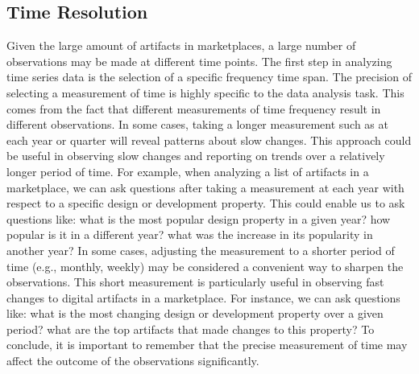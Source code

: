 \subsection{Time Resolution}
Given the large amount of artifacts in marketplaces, a large number of observations may be made at different time points.
The first step in analyzing time series data is the selection of a specific frequency time span.
The precision of selecting a measurement of time is highly specific to the data analysis task.
This comes from the fact that different measurements of time frequency result in different observations.
In some cases, taking a longer measurement such as at each year or quarter will reveal patterns about slow changes.
This approach could be useful in observing slow changes and reporting on trends over a relatively longer period of time.
For example, when analyzing a list of artifacts in a marketplace, we can ask questions after taking a measurement at each year with respect to a specific design or development property.
This could enable us to ask questions like: what is the most popular design property in a given year? how popular is it in a different year? what was the increase in its popularity in another year?
In some cases, adjusting the measurement to a shorter period of time (e.g., monthly, weekly) may be considered a convenient way to sharpen the observations.
This short measurement is particularly useful in observing fast changes to digital artifacts in a marketplace.
For instance, we can ask questions like: what is the most changing design or development property over a given period? what are the top artifacts that made changes to this property?
To conclude, it is important to remember that the precise measurement of time may affect the outcome of the observations significantly.

